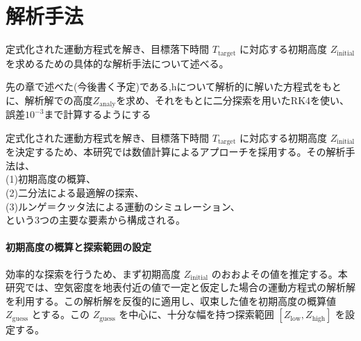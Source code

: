 \documentclass[a4paper,12pt]{article}
\begin{document}
\section{解析手法}


定式化された運動方程式を解き、目標落下時間 $T_{\mathrm{target}}$ に対応する初期高度 $Z_{\mathrm{initial}}$ を求めるための具体的な解析手法について述べる。

先の章で述べた(今後書く予定)である,hについて解析的に解いた方程式をもとに、解析解での高度$Z_{\mathrm{analy}}$を求め、それをもとに二分探索を用いたRK4を使い、誤差$10^{-3}$まで計算するようにする

\label{sec:method}

定式化された運動方程式を解き、目標落下時間 $T_{\mathrm{target}}$ に対応する初期高度 $Z_{\mathrm{initial}}$ を決定するため、本研究では数値計算によるアプローチを採用する。その解析手法は、
\\(1)初期高度の概算、
\\(2)二分法による最適解の探索、
\\(3)ルンゲ＝クッタ法による運動のシミュレーション、\\という3つの主要な要素から構成される。

\paragraph{初期高度の概算と探索範囲の設定}
\label{par:initial_guess}
効率的な探索を行うため、まず初期高度 $Z_{\mathrm{initial}}$ のおおよその値を推定する。本研究では、空気密度を地表付近の値で一定と仮定した場合の運動方程式の解析解を利用する。この解析解を反復的に適用し、収束した値を初期高度の概算値 $Z_{\mathrm{guess}}$ とする。この $Z_{\mathrm{guess}}$ を中心に、十分な幅を持つ探索範囲 $[Z_{\mathrm{low}}, Z_{\mathrm{high}}]$ を設定する。
\end{document}
